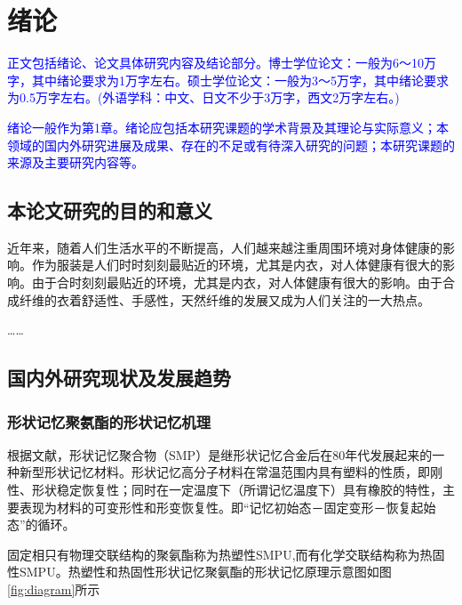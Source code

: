 
\chapter{绪论}

\textcolor{blue}{
  正文包括绪论、论文具体研究内容及结论部分。博士学位论文：一般为6～10万字，其中绪论要求为1万字左右。硕士学位论文：一般为3～5万字，其中绪论要求为0.5万字左右。(外语学科：中文、日文不少于3万字，西文2万字左右。)
}

\textcolor{blue}{
  绪论一般作为第1章。绪论应包括本研究课题的学术背景及其理论与实际意义；本领域的国内外研究进展及成果、存在的不足或有待深入研究的问题；本研究课题的来源及主要研究内容等。
}


\label{chap:intro}
\section{本论文研究的目的和意义}

近年来，随着人们生活水平的不断提高，人们越来越注重周围环境对身体健康的影响。作为服装是人们时时刻刻最贴近的环境，尤其是内衣，对人体健康有很大的影响。由于合时刻刻最贴近的环境，尤其是内衣，对人体健康有很大的影响。由于合成纤维的衣着舒适性、手感性，天然纤维的发展又成为人们关注的一大热点。

……\cite{Takahashi1996Structure,Xia2002Analysis,Jiang1989,Mao2000Motion,Feng1998}

\section{国内外研究现状及发展趋势}

\subsection{形状记忆聚氨酯的形状记忆机理}

根据文献\parencite{Jiang2005Size}，形状记忆聚合物（SMP）是继形状记忆合金后在80年代发展起来的一种新型形状记忆材料。形状记忆高分子材料在常温范围内具有塑料的性质，即刚性、形状稳定恢复性；同时在一定温度下（所谓记忆温度下）具有橡胶的特性，主要表现为材料的可变形性和形变恢复性。即“记忆初始态－固定变形－恢复起始态”的循环。

固定相只有物理交联结构的聚氨酯称为热塑性SMPU,而有化学交联结构称为热固性SMPU。热塑性和热固性形状记忆聚氨酯的形状记忆原理示意图如图\ref{fig:diagram}所示

